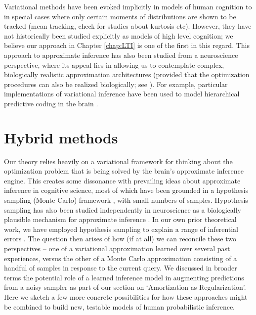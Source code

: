 Variational methods have been evoked implicitly in models of human cognition to in special cases where only certain moments of distributions are shown to be tracked (mean tracking, check for studies about kurtosis etc). However, they have not historically been studied explicitly as models of high level cognition; we believe our approach in Chapter \ref{chap:LTI} is one of the first in this regard. This approach to approximate inference has also been studied from a neuroscience perspective, where its appeal lies in allowing us to contemplate complex, biologically realistic approximation architectures (provided that the optimization procedures can also be realized biologically; see \citet{whittington2019theories}). For example, particular implementations of variational inference have been used to model hierarchical predictive coding in the brain \citep{friston2008hierarchical,gershman2019does}.


\section{Hybrid methods}

Our theory relies heavily on a variational framework for thinking about the optimization problem that is being solved by the brain's approximate inference engine. This creates some dissonance with prevailing ideas about approximate inference in cognitive science, most of which have been grounded in a hypothesis sampling (Monte Carlo) framework \citep[see][for a review]{sanborn2016bayesian}, with small numbers of samples. Hypothesis sampling has also been studied independently in neuroscience as a biologically plausible mechanism for approximate inference \citep[e.g.,][]{buesing2011neural,haefner2016perceptual}. In our own prior theoretical work, we have employed hypothesis sampling to explain a range of inferential errors \citep{dasgupta2017hypotheses,dasgupta2018remembrance}. The question then arises of how (if at all) we can reconcile these two perspectives -- one of a variational approximation learned over several past experiences, versus the other of a Monte Carlo approximation consisting of a handful of samples in response to the current query. We discussed in broader terms the potential role of a learned inference model in augmenting predictions from a noisy sampler as part of our section on `Amortization as Regularization'. Here we sketch a few more concrete possibilities for how these approaches might be combined to build new, testable models of human probabilistic inference.

